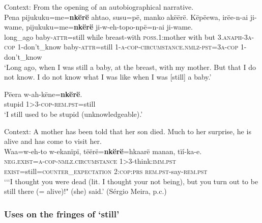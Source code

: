 \begin{exe}
	\ex\label{exAppendixTrio1}
	Context: From the opening of an autobiographical narrative.\\
	\gll Pena pijukuku=me=\textbf{nkërë}  ahtao, susu=pë, manko akëërë. Këpëewa, irëe-n-ai ji-wame, pijukuku=me=\textbf{nkërë} ji-w-eh-topo-npë=n-ai ji-wame.\\
	long\_ago baby-\textsc{attr}=still while breast-with \textsc{poss}.1:mother with but 3.\textsc{anaph}-3\textsc{a}-\textsc{cop} 1-don't\_know baby-\textsc{attr}=still 1-\textsc{a}-\textsc{cop}-\textsc{circumstance}.\textsc{nmlz}-\textsc{pst}=3\textsc{a}-\textsc{cop} 1-don't\_know\\
	\glt \lq Long ago, when I was still a baby, at the breast, with my mother. But that I do not know. I do not know what I was like when I was [still] a baby.' \parencite[606]{Meira1999}
		
	\ex
	\gll Pëera w-ah-këne=\textbf{nkërë}.\\
	stupid 1>3-\textsc{cop}-\textsc{rem}.\textsc{pst}=still\\
	\glt \lq I still used to be stupid (unknowledgeable).'  \parencite[295]{Carlin2004}
	
	\ex\label{exAppendixTrio3}
	Context: A mother has been told that her son died. Much to her surprise, he is alive and has come to visit her.\\
	\gll Waa=w-eh-to w-ekanïpï, tëërë=\textbf{nkërë}=hkaarë manan, tïí-ka-e.\\
	\textsc{neg}.\textsc{exist}=\textsc{a}-\textsc{cop}-\textsc{nmlz}.\textsc{circumstance}  1>3-think:\textsc{imm.pst} \textsc{exist}=still=\textsc{counter\_expectation}  2:\textsc{cop}:\textsc{prs}   \textsc{rem}.\textsc{pst}-say-\textsc{rem}.\textsc{pst}\\
	\glt \lq {\lq\lq}I thought you were dead (lit. I thought your not being), but you turn out to be still there (= alive)!" (she) said.' (Sérgio Meira, p.c.)
\end{exe}

\subsubsection{Uses on the fringes of \lq{}still\rq{}}
